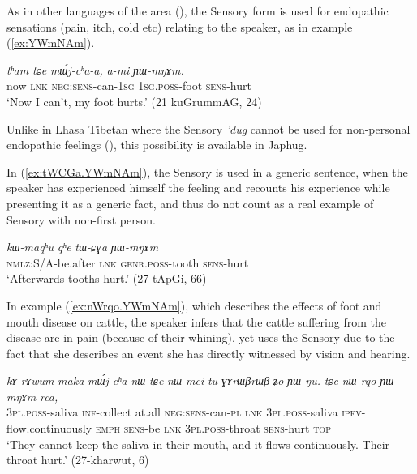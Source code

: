 \documentclass[oldfontcommands,oneside,a4paper,11pt]{article}
\newcommand{\ipa}[1]{{\phon\textit{#1}}} %
\newcommand{\refb}[1]{(\ref{#1})}
\begin{document}
As in other languages of the area (\citealt{tournadre14evidentiality}), the Sensory form is used for endopathic sensations (pain, itch, cold etc)  relating to the speaker, as in example \refb{ex:YWmNAm}.

\begin{exe}
\ex \label{ex:YWmNAm}
\gll
\ipa{tʰam} 	\ipa{tɕe} 	\ipa{mɯ́j-cʰa-a,} 	\ipa{a-mi} 	\ipa{ɲɯ-mŋɤm.} \\
now \textsc{lnk} \textsc{neg:sens}-can-\textsc{1sg} \textsc{1sg.poss}-foot \textsc{sens}-hurt \\
\glt `Now I can't, my foot hurts.' (21 kuGrummAG, 24)
\end{exe}


Unlike in Lhasa Tibetan where the Sensory \ipa{'dug} cannot be used for non-personal endopathic feelings (\citealt{tournadre14evidentiality}), this possibility is available in Japhug. 

In \refb{ex:tWCGa.YWmNAm}, the Sensory is used in a generic sentence, when the speaker has experienced himself the feeling and recounts his experience while presenting it as a generic fact, and thus do not count as a real example of Sensory with non-first person.

\begin{exe}
\ex \label{ex:tWCGa.YWmNAm}
\gll
\ipa{kɯ-maqʰu}  	\ipa{qʰe}  	\ipa{tɯ-ɕɣa}  	\ipa{ɲɯ-mŋɤm}  \\
\textsc{nmlz}:S/A-be.after \textsc{lnk} \textsc{genr.poss}-tooth \textsc{sens}-hurt \\
\glt `Afterwards tooths hurt.' (27 tApGi, 66)
\end{exe}

In example \refb{ex:nWrqo.YWmNAm}, which describes the effects of foot and mouth disease on cattle, the speaker  infers that the cattle suffering from the disease are in pain (because of their whining), yet uses the Sensory due to the fact that she describes an event she has directly witnessed by vision and hearing. 

\begin{exe}
\ex \label{ex:nWrqo.YWmNAm}
\gll \ipa{nɯ-mci} 	\ipa{kɤ-rɤwum} 	\ipa{maka} 	\ipa{mɯ́j-cʰa-nɯ} 	\ipa{tɕe} 	\ipa{nɯ-mci} 	\ipa{tu-ɣɤrɯβrɯβ} 	\ipa{ʑo} 	\ipa{ɲɯ-ŋu.}  
\ipa{tɕe} 	\ipa{nɯ-rqo} 	\ipa{ɲɯ-mŋɤm} 	\ipa{rca,} \\
\textsc{3pl.poss}-saliva \textsc{inf}-collect at.all \textsc{neg:sens}-can-\textsc{pl} \textsc{lnk} \textsc{3pl.poss}-saliva \textsc{ipfv}-flow.continuously \textsc{emph} \textsc{sens}-be \textsc{lnk} \textsc{3pl.poss}-throat \textsc{sens}-hurt \textsc{top}  \\
\glt `They cannot keep the saliva in their mouth, and it flows continuously. Their throat hurt.' (27-kharwut, 6)
\end{exe}
\end{document}
